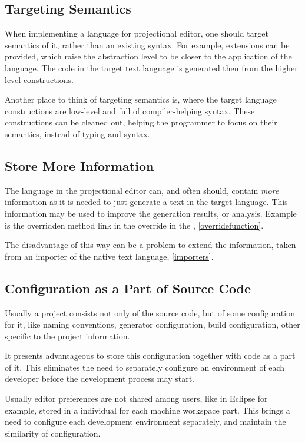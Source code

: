\subsection{Targeting Semantics}

 When implementing a language for projectional editor, one should target semantics of it, rather than an existing syntax.
For example, extensions can be provided, which raise the abstraction level to be closer to the application of the language.
The code in the target text language is generated then from the higher level constructions. 

Another place to think of targeting semantics is, where the target language constructions are low-level and 
full of compiler-helping syntax. These constructions can be cleaned out, helping the programmer to focus on their
semantics, instead of typing and syntax.

\subsection{Store More Information}

 The language in the projectional editor can, and often should, contain \emph{more} information as it is needed 
 to just generate a text in the target language. This information may be used to improve the generation results, or
 analysis. Example is the overridden method link in the override in the \pcpp, \ref{overridefunction}.
 
 The disadvantage of this way can be a problem to extend the information, taken from an importer of the native text language,
 \ref{importers}.

\subsection{Configuration as a Part of Source Code}
 Usually a project consists not only of the source code, but of some configuration for it, like naming conventions, 
 generator configuration, build configuration, other specific to the project information.
 
 It presents advantageous to store this configuration together with code as a part of it. This eliminates the need 
 to separately configure an environment of each developer before the development process may start.

 Usually editor preferences are not shared among users, like in Eclipse for example, stored in a individual for each 
 machine workspace part. This brings a need to configure each development environment separately, and maintain the similarity
 of configuration.
 
